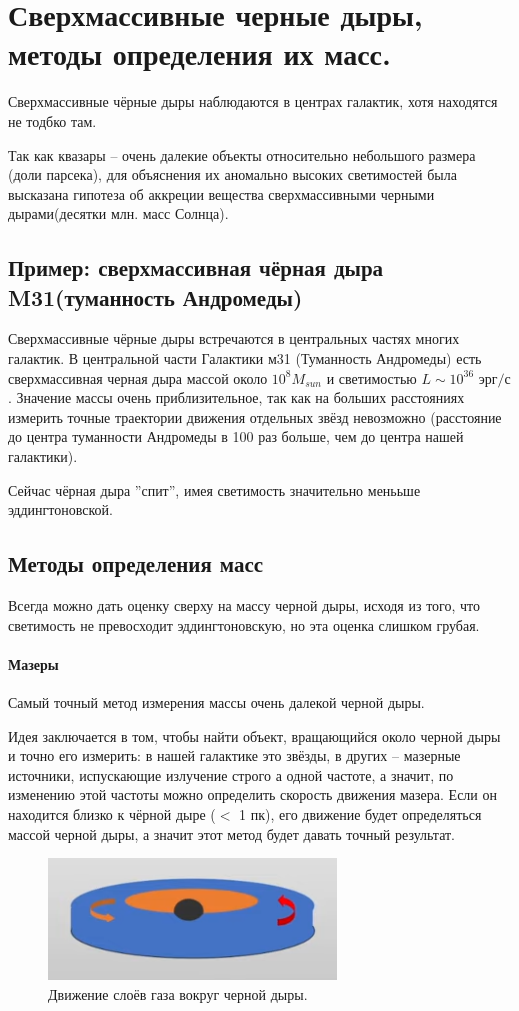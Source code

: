 \section{Сверхмассивные черные дыры, методы определения их масс.}
Сверхмассивные чёрные дыры наблюдаются в центрах галактик, хотя находятся не тодбко там.

Так как квазары -- очень далекие объекты относительно небольшого размера (доли парсека), для объяснения их аномально высоких светимостей была высказана гипотеза об аккреции вещества сверхмассивными черными дырами(десятки млн. масс Солнца).

\subsection{Пример: сверхмассивная чёрная дыра M31(туманность Андромеды)}

Сверхмассивные чёрные дыры встречаются в центральных частях многих галактик. В центральной части Галактики м31 (Туманность Андромеды) есть сверхмассивная черная дыра массой около $10^8 M_{sun}$ и светимостью $L \sim 10^{36} \text{ эрг/с}$. Значение массы очень приблизительное, так как на больших расстояниях измерить точные траектории движения отдельных звёзд невозможно (расстояние до центра туманности Андромеды в 100 раз больше, чем до центра нашей галактики).

Сейчас чёрная дыра ''спит'', имея светимость значительно менььше эддингтоновской.

\subsection{Методы определения масс}

Всегда можно дать оценку сверху на массу черной дыры, исходя из того, что светимость не превосходит эддингтоновскую, но эта оценка слишком грубая.

\paragraph{Мазеры} Самый точный метод измерения массы очень далекой черной дыры.

Идея заключается в том, чтобы найти объект, вращающийся около черной дыры и точно его измерить: в нашей галактике это звёзды, в других -- мазерные источники, испускающие излучение строго а одной частоте, а значит, по изменению этой частоты можно определить скорость движения мазера. Если он находится близко к чёрной дыре ($<$ 1 пк), его движение будет определяться массой черной дыры, а значит этот метод будет давать точный результат.
\begin{figure}
  \centering
    \includegraphics[width=0.7\linewidth]{Pictures/14_disk.png}
  \caption{Движение слоёв газа вокруг черной дыры.}
  \label{fig:14_disk}
 \end{figure}
